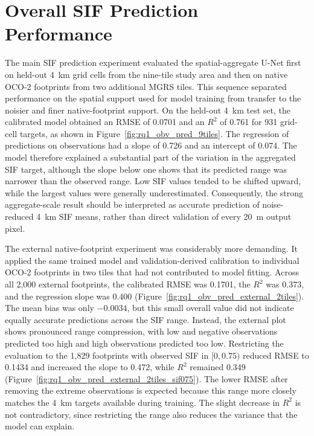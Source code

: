 

\section{Overall SIF Prediction Performance}

The main SIF prediction experiment evaluated the spatial-aggregate U-Net first on held-out
4~km grid cells from the nine-tile study area and then on native OCO-2 footprints from two
additional MGRS tiles. This sequence separated performance on the spatial support used for
model training from transfer to the noisier and finer native-footprint support. On the
held-out 4~km test set, the calibrated model obtained an RMSE of 0.0701 and an $R^2$ of
0.761 for 931 grid-cell targets, as shown in
Figure~\ref{fig:rq1_obv_pred_9tiles}. The regression of predictions on observations had a
slope of 0.726 and an intercept of 0.074. The model therefore explained a substantial part
of the variation in the aggregated SIF target, although the slope below one shows that its
predicted range was narrower than the observed range. Low SIF values tended to be shifted
upward, while the largest values were generally underestimated. Consequently, the strong
aggregate-scale result should be interpreted as accurate prediction of noise-reduced 4~km
SIF means, rather than direct validation of every 20~m output pixel.

The external native-footprint experiment was considerably more demanding. It applied the
same trained model and validation-derived calibration to individual OCO-2 footprints in two
tiles that had not contributed to model fitting. Across all 2,000 external footprints, the
calibrated RMSE was 0.1701, the $R^2$ was 0.373, and the regression slope was 0.400
(Figure~\ref{fig:rq1_obv_pred_external_2tiles}). The mean bias was only $-0.0034$, but this
small overall value did not indicate equally accurate predictions across the SIF range.
Instead, the external plot shows pronounced range compression, with low and negative
observations predicted too high and high observations predicted too low. Restricting the
evaluation to the 1,829 footprints with observed SIF in $[0,0.75)$ reduced RMSE to 0.1434
and increased the slope to 0.472, while $R^2$ remained 0.349
(Figure~\ref{fig:rq1_obv_pred_external_2tiles_sif075}). The lower RMSE after removing the
extreme observations is expected because this range more closely matches the 4~km targets
available during training. The slight decrease in $R^2$ is not contradictory, since
restricting the range also reduces the variance that the model can explain.

